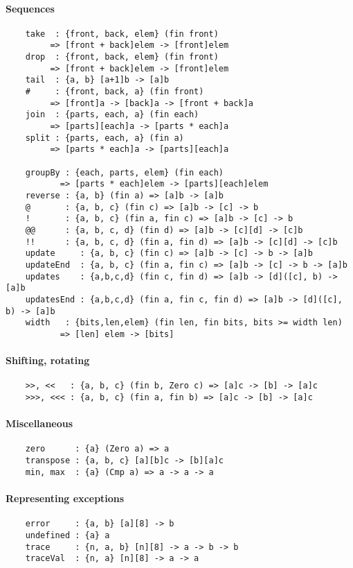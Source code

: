 \paragraph*{Sequences}
\begin{Verbatim}
    take  : {front, back, elem} (fin front)
         => [front + back]elem -> [front]elem
    drop  : {front, back, elem} (fin front)
         => [front + back]elem -> [front]elem
    tail  : {a, b} [a+1]b -> [a]b
    #     : {front, back, a} (fin front)
         => [front]a -> [back]a -> [front + back]a
    join  : {parts, each, a} (fin each)
         => [parts][each]a -> [parts * each]a
    split : {parts, each, a} (fin a)
         => [parts * each]a -> [parts][each]a

    groupBy : {each, parts, elem} (fin each)
           => [parts * each]elem -> [parts][each]elem
    reverse : {a, b} (fin a) => [a]b -> [a]b
    @       : {a, b, c} (fin c) => [a]b -> [c] -> b
    !       : {a, b, c} (fin a, fin c) => [a]b -> [c] -> b
    @@      : {a, b, c, d} (fin d) => [a]b -> [c][d] -> [c]b
    !!      : {a, b, c, d} (fin a, fin d) => [a]b -> [c][d] -> [c]b
    update     : {a, b, c} (fin c) => [a]b -> [c] -> b -> [a]b
    updateEnd  : {a, b, c} (fin a, fin c) => [a]b -> [c] -> b -> [a]b
    updates    : {a,b,c,d} (fin c, fin d) => [a]b -> [d]([c], b) -> [a]b
    updatesEnd : {a,b,c,d} (fin a, fin c, fin d) => [a]b -> [d]([c], b) -> [a]b
    width   : {bits,len,elem} (fin len, fin bits, bits >= width len)
           => [len] elem -> [bits]
\end{Verbatim}
\paragraph*{Shifting, rotating}
\begin{Verbatim}
    >>, <<   : {a, b, c} (fin b, Zero c) => [a]c -> [b] -> [a]c
    >>>, <<< : {a, b, c} (fin a, fin b) => [a]c -> [b] -> [a]c
\end{Verbatim}
\paragraph*{Miscellaneous}
\begin{Verbatim}
    zero      : {a} (Zero a) => a
    transpose : {a, b, c} [a][b]c -> [b][a]c
    min, max  : {a} (Cmp a) => a -> a -> a
\end{Verbatim}
\paragraph*{Representing exceptions}
\begin{Verbatim}
    error     : {a, b} [a][8] -> b
    undefined : {a} a
    trace     : {n, a, b} [n][8] -> a -> b -> b
    traceVal  : {n, a} [n][8] -> a -> a
\end{Verbatim}


